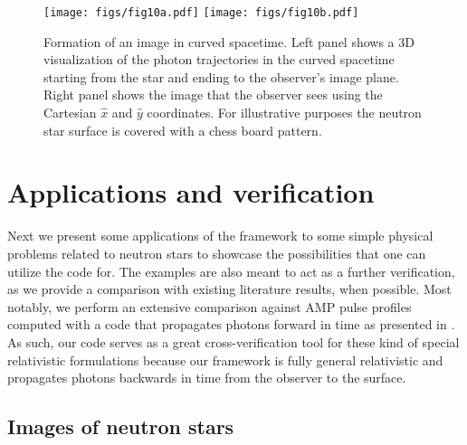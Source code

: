\documentclass{aa}
\newcommand{\refe}[1]{#1}
\newcommand{\refedel}[1]{}
\newcommand{\lgamma}{\gamma_{\text{L}}}
\begin{document}
\begin{figure}
\centering
\texttt{[image: figs/fig10a.pdf]}
\texttt{[image: figs/fig10b.pdf]}
\caption{\label{fig:image}
  Formation of an image in curved spacetime.
  Left panel shows a 3D visualization of the photon trajectories in the curved spacetime starting from the star and ending to the observer's image plane.
  Right panel shows the image that the observer sees using the Cartesian $\hat{x}$ and $\hat{y}$ coordinates.
  For illustrative purposes the neutron star surface is covered with a chess board pattern.
  }
\end{figure}


\section{Applications and \refe{verification}}\label{sect:appl}

Next we present some applications of the framework to some simple physical problems related to neutron stars to showcase the possibilities that one can utilize the code for.
The examples are also meant to act as a further \refe{verification}, as we provide a comparison with existing literature results, when possible.
Most notably, we \refedel{employ}\refe{perform} an extensive comparison against AMP pulse profiles computed with a code that propagates photons forward in time as presented in \citet{PB06}.
As such, our code serves as a great cross-\refe{verification} tool for these kind of special relativistic formulations because our framework is fully general relativistic and propagates photons backwards in time from the observer to the surface.




\subsection{Images of neutron stars}
\end{document}
